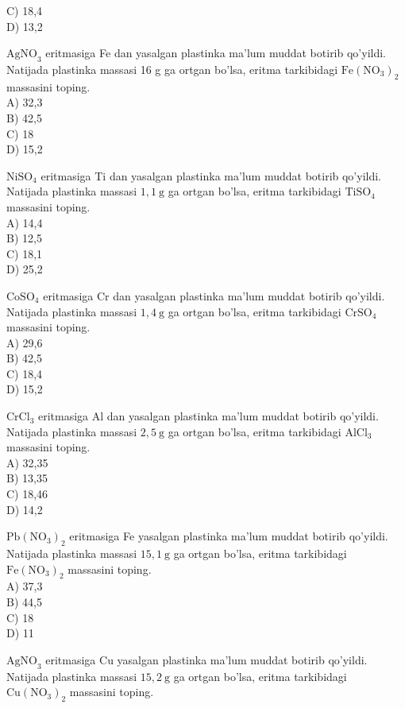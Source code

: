 C) 18,4\\
D) 13,2
  \item $\mathrm{AgNO}_{3}$ eritmasiga Fe dan yasalgan plastinka ma'lum muddat botirib qo'yildi. Natijada plastinka massasi 16 g ga ortgan bo'lsa, eritma tarkibidagi $\mathrm{Fe}\left(\mathrm{NO}_{3}\right)_{2}$ massasini toping.\\
A) 32,3\\
B) 42,5\\
C) 18\\
D) 15,2
  \item $\mathrm{NiSO}_{4}$ eritmasiga Ti dan yasalgan plastinka ma'lum muddat botirib qo'yildi.\\
Natijada plastinka massasi $1,1 \mathrm{~g}$ ga ortgan bo'lsa, eritma tarkibidagi $\mathrm{TiSO}_{4}$ massasini toping.\\
A) 14,4\\
B) 12,5\\
C) 18,1\\
D) 25,2
  \item $\mathrm{CoSO}_{4}$ eritmasiga Cr dan yasalgan plastinka ma'lum muddat botirib qo'yildi. Natijada plastinka massasi $1,4 \mathrm{~g}$ ga ortgan bo'lsa, eritma tarkibidagi $\mathrm{CrSO}_{4}$ massasini toping.\\
A) 29,6\\
B) 42,5\\
C) 18,4\\
D) 15,2
  \item $\mathrm{CrCl}_{3}$ eritmasiga Al dan yasalgan plastinka ma'lum muddat botirib qo'yildi. Natijada plastinka massasi $2,5 \mathrm{~g}$ ga ortgan bo'lsa, eritma tarkibidagi $\mathrm{AlCl}_{3}$ massasini toping.\\
A) 32,35\\
B) 13,35\\
C) 18,46\\
D) 14,2
  \item $\mathrm{Pb}\left(\mathrm{NO}_{3}\right)_{2}$ eritmasiga Fe yasalgan plastinka ma'lum muddat botirib qo'yildi. Natijada plastinka massasi $15,1 \mathrm{~g}$ ga ortgan bo'lsa, eritma tarkibidagi $\mathrm{Fe}\left(\mathrm{NO}_{3}\right)_{2}$ massasini toping.\\
A) 37,3\\
B) 44,5\\
C) 18\\
D) 11
  \item $\mathrm{AgNO}_{3}$ eritmasiga Cu yasalgan plastinka ma'lum muddat botirib qo'yildi. Natijada plastinka massasi $15,2 \mathrm{~g}$ ga ortgan bo'lsa, eritma tarkibidagi $\mathrm{Cu}\left(\mathrm{NO}_{3}\right)_{2}$ massasini toping.\\
